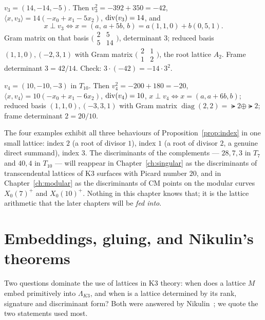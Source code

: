 \begin{example}\label{ex:disc3}
$v_3=(14,-14,-5)$. Then $v_3^2=-392+350=-42$,
$\langle x,v_3\rangle=14(-x_0+x_1-5x_2)$, $\operatorname{div}(v_3)=14$, and
\[
  x\perp v_3\iff x=(a,\,a+5b,\,b)=a(1,1,0)+b(0,5,1).
\]
Gram matrix on that basis $\bigl(\begin{smallmatrix}2&5\\5&14\end{smallmatrix}\bigr)$,
determinant $3$; reduced basis $(1,1,0),(-2,3,1)$ with Gram matrix
$\bigl(\begin{smallmatrix}2&1\\1&2\end{smallmatrix}\bigr)$, the root lattice
$A_2$. Frame determinant $3=42/14$. Check: $3\cdot(-42)=-14\cdot3^2$.
\end{example}

\begin{example}\label{ex:disc4}
$v_4=(10,-10,-3)$ in $T_{10}$. Then $v_4^2=-200+180=-20$,
$\langle x,v_4\rangle=10(-x_0+x_1-6x_2)$, $\operatorname{div}(v_4)=10$,
$x\perp v_4\iff x=(a,a+6b,b)$; reduced basis $(1,1,0),(-3,3,1)$ with Gram
matrix $\operatorname{diag}(2,2)=\lat2\oplus\lat2$; frame determinant
$2=20/10$.
\end{example}

\begin{remark}
The four examples exhibit all three behaviours of Proposition~\ref{prop:index}
in one small lattice: index $2$ (a root of divisor $1$), index $1$ (a root of
divisor $2$, a genuine direct summand), index $3$. The discriminants of the
complements --- $28,7,3$ in $T_7$ and $40,4$ in $T_{10}$ --- will reappear in
Chapter~\ref{ch:singular} as the discriminants of transcendental lattices of
K3 surfaces with Picard number $20$, and in Chapter~\ref{ch:modular} as the
discriminants of CM points on the modular curves $X_0(7)^+$ and $X_0(10)^+$.
Nothing in this chapter knows that; it is the lattice arithmetic that the
later chapters will be \emph{fed into}.
\end{remark}

\section{Embeddings, gluing, and Nikulin's theorems}

Two questions dominate the use of lattices in K3 theory: when does a lattice
$M$ embed primitively into $\Lambda_{K3}$, and when is a lattice determined by
its rank, signature and discriminant form? Both were answered by
Nikulin~\cite{Nikulin1979}; we quote the two statements used most.

